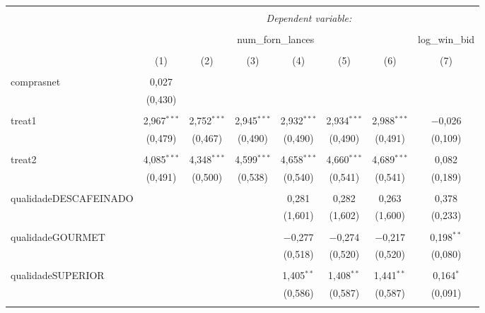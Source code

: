 
\begin{table}[!htbp] \centering 
  \caption{} 
  \label{} 
\begin{tabular}{@{\extracolsep{5pt}}lccccccc} 
\\[-1.8ex]\hline 
\hline \\[-1.8ex] 
 & \multicolumn{7}{c}{\textit{Dependent variable:}} \\ 
\cline{2-8} 
\\[-1.8ex] & \multicolumn{6}{c}{num\_forn\_lances} & log\_win\_bid \\ 
\\[-1.8ex] & (1) & (2) & (3) & (4) & (5) & (6) & (7)\\ 
\hline \\[-1.8ex] 
 comprasnet & 0,027 &  &  &  &  &  &  \\ 
  & (0,430) &  &  &  &  &  &  \\ 
  & & & & & & & \\ 
 treat1 & 2,967$^{***}$ & 2,752$^{***}$ & 2,945$^{***}$ & 2,932$^{***}$ & 2,934$^{***}$ & 2,988$^{***}$ & $-$0,026 \\ 
  & (0,479) & (0,467) & (0,490) & (0,490) & (0,490) & (0,491) & (0,109) \\ 
  & & & & & & & \\ 
 treat2 & 4,085$^{***}$ & 4,348$^{***}$ & 4,599$^{***}$ & 4,658$^{***}$ & 4,660$^{***}$ & 4,689$^{***}$ & 0,082 \\ 
  & (0,491) & (0,500) & (0,538) & (0,540) & (0,541) & (0,541) & (0,189) \\ 
  & & & & & & & \\ 
 qualidadeDESCAFEINADO &  &  &  & 0,281 & 0,282 & 0,263 & 0,378 \\ 
  &  &  &  & (1,601) & (1,602) & (1,600) & (0,233) \\ 
  & & & & & & & \\ 
 qualidadeGOURMET &  &  &  & $-$0,277 & $-$0,274 & $-$0,217 & 0,198$^{**}$ \\ 
  &  &  &  & (0,518) & (0,520) & (0,520) & (0,080) \\ 
  & & & & & & & \\ 
 qualidadeSUPERIOR &  &  &  & 1,405$^{**}$ & 1,408$^{**}$ & 1,441$^{**}$ & 0,164$^{*}$ \\ 
  &  &  &  & (0,586) & (0,587) & (0,587) & (0,091) \\ 
  & & & & & & & \\ 

\end{tabular}
\end{table}
